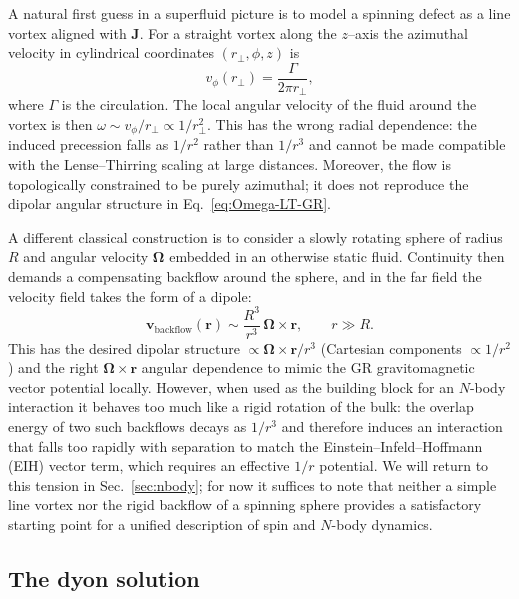 \documentclass[11pt]{article}
\begin{document}
A natural first guess in a superfluid picture is to model a spinning
defect as a line vortex aligned with $\mathbf{J}$.
For a straight vortex along the $z$–axis the azimuthal velocity
in cylindrical coordinates $(r_\perp,\phi,z)$ is
\begin{equation}
  v_\phi(r_\perp)
  = \frac{\Gamma}{2\pi r_\perp},
\end{equation}
where $\Gamma$ is the circulation.
The local angular velocity of the fluid around the vortex is then
$\omega \sim v_\phi / r_\perp \propto 1/r_\perp^2$.
This has the wrong radial dependence: the induced precession falls as
$1/r^2$ rather than $1/r^3$ and cannot be made compatible with the
Lense--Thirring scaling at large distances.
Moreover, the flow is topologically constrained to be purely
azimuthal; it does not reproduce the dipolar angular structure in
Eq.~\eqref{eq:Omega-LT-GR}.

A different classical construction is to consider a slowly rotating
sphere of radius $R$ and angular velocity $\bm{\Omega}$ embedded in
an otherwise static fluid.
Continuity then demands a compensating backflow around the sphere,
and in the far field the velocity field takes the form of a dipole:
\begin{equation}
  \mathbf{v}_{\text{backflow}}(\mathbf{r})
  \sim \frac{R^3}{r^3}\,\bm{\Omega}\times\mathbf{r},
  \qquad r \gg R.
  \label{eq:backflow}
\end{equation}
This has the desired dipolar structure $\propto \bm{\Omega}\times\mathbf{r}/r^3$
(Cartesian components $\propto 1/r^2$) and the right
$\bm{\Omega}\times\mathbf{r}$ angular dependence to mimic the GR
gravitomagnetic vector potential locally.
However, when used as the building block for an $N$-body interaction
it behaves too much like a rigid rotation of the bulk: the overlap
energy of two such backflows decays as $1/r^3$ and therefore induces
an interaction that falls too rapidly with separation to match the
Einstein--Infeld--Hoffmann (EIH) vector term, which requires an
effective $1/r$ potential.
We will return to this tension in Sec.~\ref{sec:nbody}; for now it
suffices to note that neither a simple line vortex nor the rigid
backflow of a spinning sphere provides a satisfactory starting point
for a unified description of spin and $N$-body dynamics.

\subsection{The dyon solution}
\label{subsec:spin-dyon}
\end{document}
